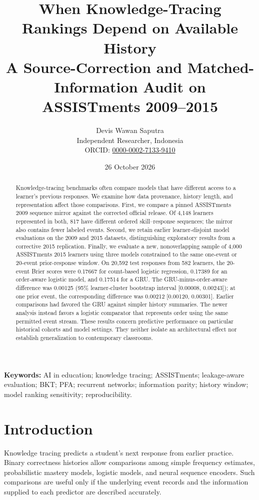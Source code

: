 \documentclass[11pt,a4paper]{article}
\title{When Knowledge-Tracing Rankings Depend on Available History\\\large A Source-Correction and Matched-Information Audit on ASSISTments 2009--2015}
\author{Devis Wawan Saputra\\\small Independent Researcher, Indonesia\\\small ORCID: \href{https://orcid.org/0000-0002-7133-9410}{0000-0002-7133-9410}}
\date{26 October 2026}
\begin{document}
\maketitle
\begin{abstract}
Knowledge-tracing benchmarks often compare models that have different access to a learner's previous responses. We examine how data provenance, history length, and representation affect those comparisons. First, we compare a pinned ASSISTments 2009 sequence mirror against the corrected official release. Of 4,148 learners represented in both, 817 have different ordered skill--response sequences; the mirror also contains fewer labeled events. Second, we retain earlier learner-disjoint model evaluations on the 2009 and 2015 datasets, distinguishing exploratory results from a corrective 2015 replication. Finally, we evaluate a new, nonoverlapping sample of 4,000 ASSISTments 2015 learners using three models constrained to the same one-event or 20-event prior-response window. On 20,592 test responses from 582 learners, the 20-event Brier scores were 0.17667 for count-based logistic regression, 0.17389 for an order-aware logistic model, and 0.17514 for a GRU. The GRU-minus-order-aware difference was 0.00125 (95\% learner-cluster bootstrap interval [0.00008, 0.00243]); at one prior event, the corresponding difference was 0.00212 [0.00120, 0.00301]. Earlier comparisons had favored the GRU against simpler history summaries. The newer analysis instead favors a logistic comparator that represents order using the same permitted event stream. These results concern predictive performance on particular historical cohorts and model settings. They neither isolate an architectural effect nor establish generalization to contemporary classrooms.

\end{abstract}
\textbf{Keywords:} AI in education; knowledge tracing; ASSISTments; leakage-aware evaluation; BKT; PFA; recurrent networks; information parity; history window; model ranking sensitivity; reproducibility.

\section{Introduction}
Knowledge tracing predicts a student's next response from earlier practice. Binary correctness histories allow comparisons among simple frequency estimates, probabilistic mastery models, logistic models, and neural sequence encoders. Such comparisons are useful only if the underlying event records and the information supplied to each predictor are described accurately.
\end{document}
